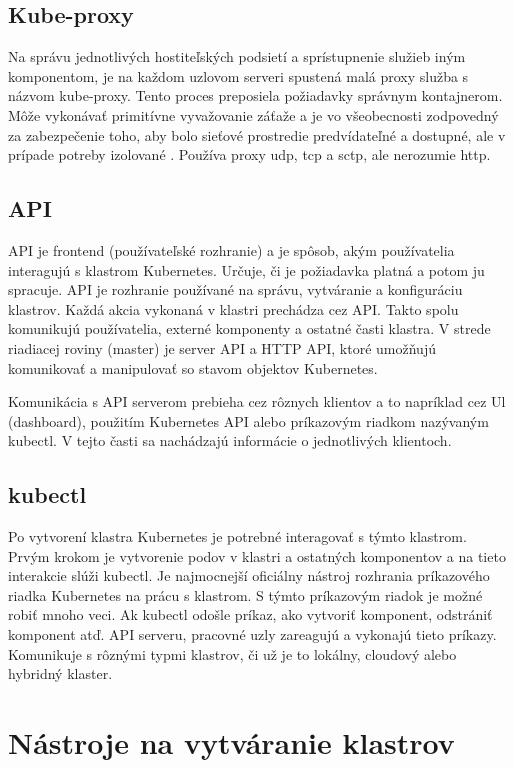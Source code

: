 \subsection*{Kube-proxy}
Na správu jednotlivých hostiteľských podsietí a sprístupnenie služieb iným komponentom, je na každom uzlovom serveri spustená malá proxy služba s názvom kube-proxy. Tento proces preposiela požiadavky správnym kontajnerom. Môže vykonávať primitívne vyvažovanie záťaže a je vo všeobecnosti zodpovedný za zabezpečenie toho, aby bolo sieťové prostredie predvídateľné a dostupné, ale v prípade potreby izolované \cite{kubeproxy}. Používa proxy \acrshort{udp}, \acrshort{tcp} a \acrshort{sctp}, ale nerozumie \acrshort{http}.

\subsection{API}

API je frontend (používateľské rozhranie) a je spôsob, akým používatelia interagujú s klastrom Kubernetes. Určuje, či je požiadavka platná a potom ju spracuje. API je rozhranie používané na správu, vytváranie a konfiguráciu klastrov. Každá akcia vykonaná v klastri prechádza cez API. Takto spolu komunikujú používatelia, externé komponenty a ostatné časti klastra. V strede riadiacej roviny (master) je server API a HTTP API, ktoré umožňujú komunikovať a manipulovať so stavom objektov Kubernetes.

Komunikácia s API serverom prebieha cez rôznych klientov a to napríklad cez Ul (dashboard), použitím Kubernetes API alebo príkazovým riadkom nazývaným kubectl. V tejto časti sa nachádzajú informácie o jednotlivých klientoch.

\subsection*{kubectl}

Po vytvorení klastra Kubernetes je potrebné interagovať s týmto klastrom. Prvým krokom je vytvorenie podov v klastri a ostatných komponentov a na tieto interakcie slúži kubectl. Je najmocnejší oficiálny nástroj rozhrania príkazového riadka Kubernetes na prácu s klastrom. S týmto príkazovým riadok je možné robiť mnoho veci. Ak kubectl odošle príkaz, ako vytvoriť komponent, odstrániť komponent atď. API serveru, pracovné uzly zareagujú a vykonajú tieto príkazy. Komunikuje s rôznými typmi klastrov, či už je to lokálny, cloudový alebo hybridný klaster.

\section{Nástroje na vytváranie klastrov}

